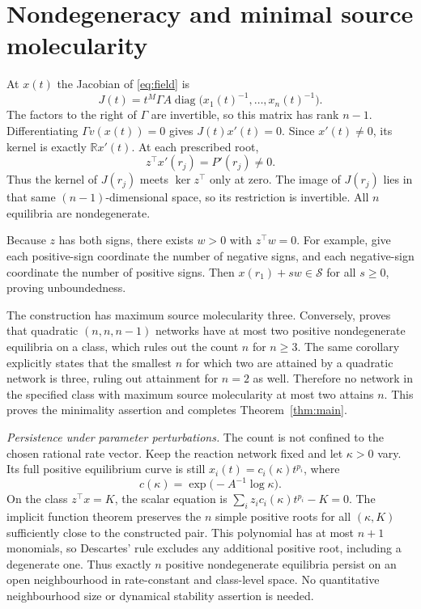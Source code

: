 \documentclass[11pt]{amsart}
\newcommand{\diag}{\operatorname{diag}}
\begin{document}
\section{Nondegeneracy and minimal source molecularity}
At $x(t)$ the Jacobian of \eqref{eq:field} is
\begin{equation}\label{eq:jacobian}
 J(t)=t^M\Gamma A\diag\bigl(x_1(t)^{-1},\ldots,x_n(t)^{-1}\bigr).
\end{equation}
The factors to the right of $\Gamma$ are invertible, so this matrix has
rank $n-1$. Differentiating $\Gamma v(x(t))=0$ gives $J(t)x'(t)=0$.
Since $x'(t)\ne0$, its kernel is exactly $\mathbb R x'(t)$.
At each prescribed root,
\begin{equation}\label{eq:transverse}
 z^\top x'(r_j)=P'(r_j)\ne0.
\end{equation}
Thus the kernel of $J(r_j)$ meets $\ker z^\top$ only at zero.
The image of $J(r_j)$ lies in that same $(n-1)$-dimensional space,
so its restriction is invertible. All $n$ equilibria are nondegenerate.

Because $z$ has both signs, there exists $w>0$ with $z^\top w=0$.
For example, give each positive-sign coordinate the number of negative
signs, and each negative-sign coordinate the number of positive signs.
Then $x(r_1)+sw\in\mathcal S$ for all $s\ge0$, proving unboundedness.

The construction has maximum source molecularity three. Conversely,
\cite[Corollary~5.16]{banajiFeliu2026} proves that quadratic
$(n,n,n-1)$ networks have at most two positive nondegenerate equilibria
on a class, which rules out the count $n$ for $n\ge3$. The same
corollary explicitly states that the smallest $n$ for which two are
attained by a quadratic network is three, ruling out attainment for
$n=2$ as well. Therefore no network in the specified class with
maximum source molecularity at most two attains $n$. This proves
the minimality assertion and completes Theorem~\ref{thm:main}.

\smallskip\noindent\emph{Persistence under parameter perturbations.}
The count is not confined to the chosen rational rate vector. Keep the
reaction network fixed and let $\kappa>0$ vary. Its full positive
equilibrium curve is still $x_i(t)=c_i(\kappa)t^{p_i}$, where
\[
 c(\kappa)=\exp\bigl(-A^{-1}\log\kappa\bigr).
\]
On the class $z^\top x=K$, the scalar equation is
$\sum_i z_i c_i(\kappa)t^{p_i}-K=0$.
The implicit function theorem preserves the $n$ simple positive roots
for all $(\kappa,K)$ sufficiently close to the constructed pair.
This polynomial has at most $n+1$ monomials, so Descartes' rule excludes
any additional positive root, including a degenerate one. Thus exactly
$n$ positive nondegenerate equilibria persist on an open neighbourhood
in rate-constant and class-level space. No quantitative neighbourhood
size or dynamical stability assertion is needed.
\end{document}
